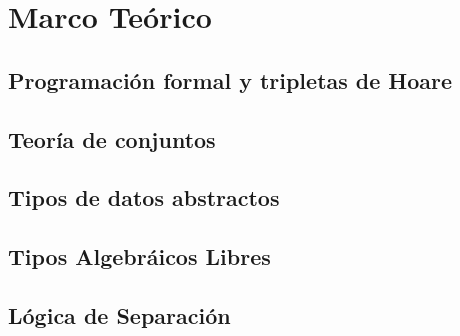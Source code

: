 \chapter{Marco Teórico}
\label{capitulo1}

\section{Programación formal y tripletas de Hoare}

\section{Teoría de conjuntos}

\section{Tipos de datos abstractos}

\section{Tipos Algebráicos Libres}

\section{Lógica de Separación}
